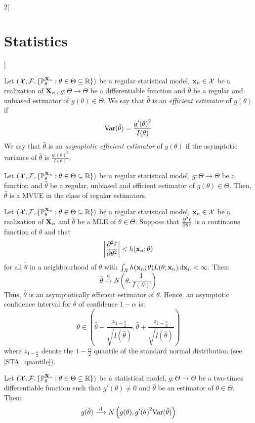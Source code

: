 \documentclass[../../../main_math.tex]{subfiles}
\begin{document}
\begin{multicols}{2}[\section{Statistics}]
  \begin{definition}
    Let $(\mathcal{X},\mathcal{F},\{\mathbb{P}_{\theta}^{\boldsymbol{\mathrm{X}}_n}:\theta\in\Theta\subseteq\mathbb{R}\})$ be a regular statistical model, $\boldsymbol{\mathrm{x}}_n\in\mathcal{X}$ be a realization of $\boldsymbol{\mathrm{X}}_n$, $g:\Theta\rightarrow\Theta$ be a differentiable function and ${\hat\theta}$ be a regular and unbiased estimator of $g({\theta})\in\Theta$. We say that $\hat\theta$ is an \emph{efficient estimator} of $g(\theta)$ if $$\mathrm{Var}(\hat\theta)=\frac{{g'(\theta)}^2}{I(\theta)}$$
    We say that $\hat\theta$ is an \emph{asymptotic efficient estimator} of $g(\theta)$ if the asymptotic variance of $\hat\theta$ is $\frac{{g'(\theta)}^2}{I(\theta)}$.
  \end{definition}
  \begin{proposition}
    Let $(\mathcal{X},\mathcal{F},\{\mathbb{P}_{\theta}^{\boldsymbol{\mathrm{X}}_n}:\theta\in\Theta\subseteq\mathbb{R}\})$ be a regular statistical model, $g:\Theta\rightarrow\Theta$ be a function and ${\hat\theta}$ be a regular, unbiased and efficient estimator of $g({\theta})\in\Theta$. Then, $\hat\theta$ is a MVUE in the class of regular estimators.
  \end{proposition}
  \begin{theorem}
    Let $(\mathcal{X},\mathcal{F},\{\mathbb{P}_{\theta}^{\boldsymbol{\mathrm{X}}_n}:\theta\in\Theta\subseteq \mathbb{R}\})$ be a regular statistical model, $\boldsymbol{\mathrm{x}}_n\in\mathcal{X}$ be a realization of $\boldsymbol{\mathrm{X}}_n$ and ${\hat\theta}$ be a MLE of ${\theta}\in\Theta$. Suppose that $\pdv[2]{\ell}{\theta}$ is a continuous function of $\theta$ and that $$\left|\pdv[2]{\ell}{\theta}(\tilde{\theta};\boldsymbol{\mathrm{x}}_n)\right|<h(\boldsymbol{\mathrm{x}}_n;\theta)$$
    for all $\tilde{\theta}$ in a neighbourhood of $\theta$ with $\int_\mathcal{X}h(\boldsymbol{\mathrm{x}}_n;\theta)L(\theta;\boldsymbol{\mathrm{x}}_n)\dd{\boldsymbol{\mathrm{x}}_n}<\infty$. Then:
    $$\hat\theta\overset{\text{d}}{\longrightarrow}N\left(\theta,\frac{1}{I(\theta)}\right)$$
    Thus, ${\hat\theta}$ is an asymptotically efficient estimator of $\theta$. Hence, an asymptotic confidence interval for $\theta$ of confidence $1-\alpha$ is:
    $$\theta\in\left(\hat\theta-\frac{z_{1-\frac{\alpha}{2}}}{\sqrt{I(\hat\theta)}},\hat\theta+\frac{z_{1-\frac{\alpha}{2}}}{\sqrt{I(\hat\theta)}}\right)$$
    where $z_{1-\frac{\alpha}{2}}$ denote the $1-\frac{\alpha}{2}$ quantile of the standard normal distribution (see \cref{STA_quantile}).
  \end{theorem}
  \begin{theorem}
    Let $(\mathcal{X},\mathcal{F},\{\mathbb{P}_{\theta}^{\boldsymbol{\mathrm{X}}_n}:\theta\in\Theta\subseteq\mathbb{R}\})$ be a statistical model, $g:\Theta\rightarrow\Theta$ be a two-times differentiable function such that $g'(\theta)\ne 0$ and $\hat\theta$ be an estimator of $\theta\in\Theta$. Then:
    $$g(\hat\theta)\overset{\text{d}}{\longrightarrow}N\left(g(\theta),{g'(\theta)}^2\mathrm{Var}(\hat\theta)\right)$$
  \end{theorem}

\end{multicols}
\end{document}
